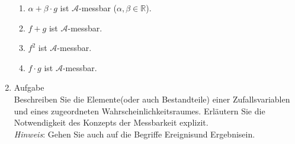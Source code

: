 \documentclass[12pt,a4paper]{article}
\begin{document}
\begin{enumerate}
\begin{enumerate}[label=(\roman*)]
\item $\alpha + \beta \cdot g$ ist $\mathscr{A}$-messbar ($\alpha, \beta \in \mathbb{R}$).

\item $f + g$ ist $\mathscr{A}$-messbar.

\item $f ^2$ ist $\mathscr{A}$-messbar.

\item $f \cdot g$ ist $\mathscr{A}$-messbar.

\end{enumerate}


\item Aufgabe \\
Beschreiben Sie die \glqq Elemente\grqq(oder auch Bestandteile) einer Zufallsvariablen und eines zugeordneten Wahrscheinlichkeitsraumes. Erläutern Sie die Notwendigkeit des Konzepts der Messbarkeit explizit.\\ \textit{Hinweis}: Gehen Sie auch auf die Begriffe \glqq Ereignis\grqq und \glqq Ergebnis\grqq ein.


\end{enumerate}
\end{document}
